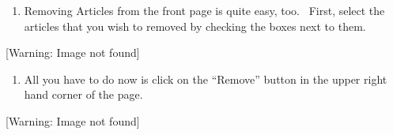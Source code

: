 \documentclass[12pt,twoside]{article}
\newcounter{saveenum}
\newcommand\liststyleLiv{%
\renewcommand\theenumi{\arabic{enumi}}
\renewcommand\theenumii{\arabic{enumii}}
\renewcommand\theenumiii{\arabic{enumiii}}
\renewcommand\theenumiv{\arabic{enumiv}}
\renewcommand\labelenumi{3.\theenumi)}
\renewcommand\labelenumii{\theenumii.}
\renewcommand\labelenumiii{\theenumiii.}
\renewcommand\labelenumiv{\theenumiv.}
}
\begin{document}
\bigskip

\liststyleLiv
\setcounter{saveenum}{\value{enumi}}
\begin{enumerate}
\setcounter{enumi}{\value{saveenum}}
\item {
Removing Articles from the front page is quite easy, too. \ First,
select the articles that you wish to removed by checking the boxes next
to them.}
\end{enumerate}
{\centering{}
 [Warning: Image not found] 
\par}

\liststyleLiv
\setcounter{saveenum}{\value{enumi}}
\begin{enumerate}
\setcounter{enumi}{\value{saveenum}}
\item {
All you have to do now is click on the ``Remove'' button in the upper
right hand corner of the page.}
\end{enumerate}
{\centering{}
 [Warning: Image not found] 
\par}
\end{document}
